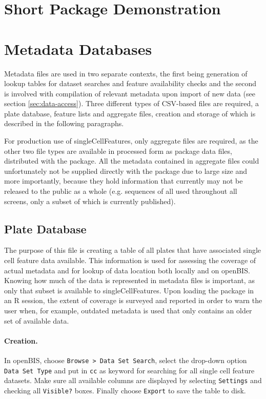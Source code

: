 \section{Short Package Demonstration}


\section{Metadata Databases}
\label{sec:update-metadata}
Metadata files are used in two separate contexts, the first being generation of lookup tables for dataset searches and feature availability checks and the second is involved with compilation of relevant metadata upon import of new data (see section \ref{sec:data-access}). Three different types of CSV-based files are required, a plate database, feature lists and aggregate files, creation and storage of which is described in the following paragraphs.

For production use of singleCellFeatures, only aggregate files are required, as the other two file types are available in processed form as package data files, distributed with the package. All the metadata contained in aggregate files could unfortunately not be supplied directly with the package due to large size and more importantly, because they hold information that currently may not be released to the public as a whole (e.g. sequences of all  used throughout all screens, only a subset of which is currently published).

\subsection{Plate Database}
\label{sec:plate-database}
The purpose of this file is creating a table of all plates that have associated single cell feature data available. This information is used for assessing the coverage of actual metadata and for lookup of data location both locally and on openBIS. Knowing how much of the data is represented in metadata files is important, as only that subset is available to singleCellFeatures. Upon loading the package in an R session, the extent of coverage is surveyed and reported in order to warn the user when, for example, outdated metadata is used that only contains an older set of available data.

\paragraph{Creation.}
In openBIS, choose \texttt{Browse > Data Set Search}, select the drop-down option \texttt{Data Set Type} and put in \texttt{cc} as keyword for searching for all single cell feature datasets. Make sure all available columns are displayed by selecting \texttt{Settings} and checking all \texttt{Visible?} boxes. Finally choose \texttt{Export} to save the table to disk.

